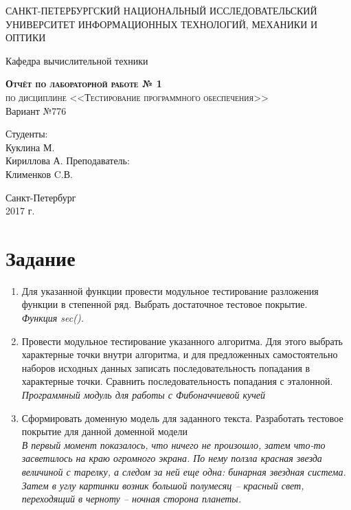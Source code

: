 \documentclass[a4paper,10pt]{article}
\begin{document}
    \begin{titlepage}
        \begin{center}
            \large
            САНКТ-ПЕТЕРБУРГСКИЙ НАЦИОНАЛЬНЫЙ ИССЛЕДОВАТЕЛЬСКИЙ УНИВЕРСИТЕТ ИНФОРМАЦИОННЫХ ТЕХНОЛОГИЙ, МЕХАНИКИ И ОПТИКИ \\


            \vspace{3cm}


            Кафедра вычислительной техники
            \vspace{4cm}

            \textsc{ \textbf{Отчёт по лабораторной работе  № 1} \\
            по дисциплине <<Тестирование программного обеспечения>>\\}
            Вариант №776\\[8mm]

            \bigskip
        \end{center}
        \vspace{3cm}

        \hfill\begin{flushright}
             Студенты: \\ Куклина М. \\ Кириллова А. 
             \vfill
             Преподаватель: \\ Клименков C.В. 
        \end{flushright}
        \vfill
        \vfill
        \vfill
        \vfill
        \vfill
        \begin{center}
            Санкт-Петербург \\2017 г.
        \end{center}
    \end{titlepage}
\newpage
\section*{Задание}
\begin{enumerate}
    \item  Для указанной функции провести модульное тестирование разложения функции в степенной ряд. Выбрать достаточное тестовое покрытие. \\
        \textit{Функция sec().}
    \item  Провести модульное тестирование указанного алгоритма. Для этого выбрать характерные точки внутри алгоритма, и для предложенных самостоятельно наборов исходных данных записать последовательность попадания в характерные точки. Сравнить последовательность попадания с эталонной. \\
        \textit{Программный модуль для работы с Фибоначчиевой кучей }
    \item Сформировать доменную модель для заданного текста.  Разработать тестовое покрытие для данной доменной модели \\
        \textit{В первый момент показалось, что ничего не произошло, затем что-то засветилось на краю огромного экрана. 
        По нему ползла красная звезда величиной с тарелку, а следом за ней еще одна: бинарная звездная система.
        Затем в углу картинки возник большой полумесяц -- красный свет, переходящий в черноту -- ночная сторона планеты. }
\end{enumerate}
\end{document}
